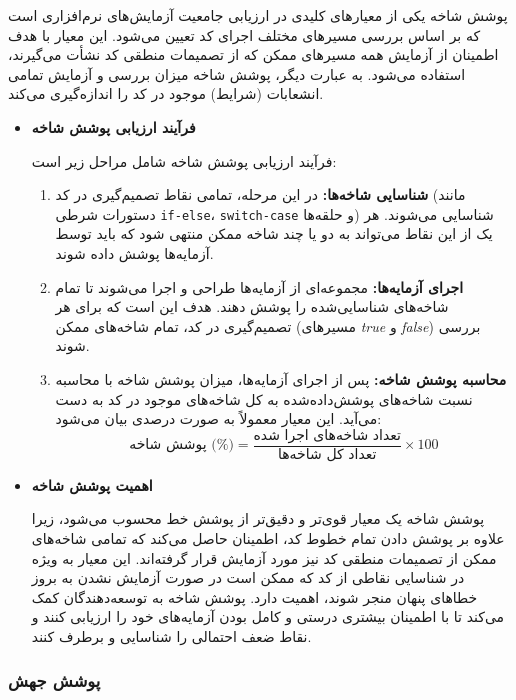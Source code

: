 پوشش شاخه  یکی از معیارهای کلیدی در ارزیابی جامعیت آزمایش‌های نرم‌افزاری است که بر اساس بررسی مسیرهای مختلف اجرای کد تعیین می‌شود. این معیار با هدف اطمینان از آزمایش همه مسیرهای ممکن که از تصمیمات منطقی کد نشأت می‌گیرند، استفاده می‌شود. به عبارت دیگر، پوشش شاخه میزان بررسی و آزمایش تمامی انشعابات (شرایط) موجود در کد را اندازه‌گیری می‌کند.
\begin{itemize}
	
	\item \textbf{فرآیند ارزیابی پوشش شاخه}

فرآیند ارزیابی پوشش شاخه شامل مراحل زیر است:

\begin{enumerate}
	\item \textbf{شناسایی شاخه‌ها:} در این مرحله، تمامی نقاط تصمیم‌گیری در کد (مانند دستورات شرطی \texttt{if-else}، \texttt{switch-case} و حلقه‌ها) شناسایی می‌شوند. هر یک از این نقاط می‌تواند به دو یا چند شاخه ممکن منتهی شود که باید توسط آزمایه‌ها پوشش داده شوند.
	\item \textbf{اجرای آزمایه‌ها:} مجموعه‌ای از آزمایه‌ها طراحی و اجرا می‌شوند تا تمام شاخه‌های شناسایی‌شده را پوشش دهند. هدف این است که برای هر تصمیم‌گیری در کد، تمام شاخه‌های ممکن (مسیرهای \textit{true} و \textit{false}) بررسی شوند.
	\item \textbf{محاسبه پوشش شاخه:} پس از اجرای آزمایه‌ها، میزان پوشش شاخه با محاسبه نسبت شاخه‌های پوشش‌داده‌شده به کل شاخه‌های موجود در کد به دست می‌آید. این معیار معمولاً به صورت درصدی بیان می‌شود:
	\[
	\text{پوشش شاخه (\%)} = \frac{\text{تعداد شاخه‌های اجرا شده}}{\text{تعداد کل شاخه‌ها}} \times 100
	\]
\end{enumerate}

\item \textbf{اهمیت پوشش شاخه}

پوشش شاخه یک معیار قوی‌تر و دقیق‌تر از پوشش خط محسوب می‌شود، زیرا علاوه بر پوشش دادن تمام خطوط کد، اطمینان حاصل می‌کند که تمامی شاخه‌های ممکن از تصمیمات منطقی کد نیز مورد آزمایش قرار گرفته‌اند. این معیار به ویژه در شناسایی نقاطی از کد که ممکن است در صورت آزمایش نشدن به بروز خطاهای پنهان منجر شوند، اهمیت دارد. پوشش شاخه به توسعه‌دهندگان کمک می‌کند تا با اطمینان بیشتری درستی و کامل بودن آزمایه‌های خود را ارزیابی کنند و نقاط ضعف احتمالی را شناسایی و برطرف کنند.
\end{itemize}

\subsubsection{پوشش جهش}

